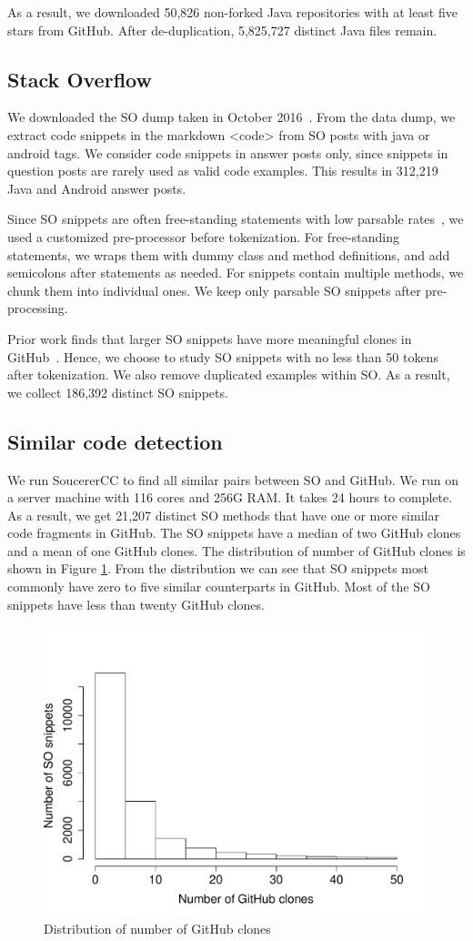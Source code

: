 As a result, we downloaded 50,826 non-forked Java repositories with at least five stars from GitHub. After de-duplication, 5,825,727 distinct Java files remain.


\subsection{Stack Overflow}
We downloaded the SO dump taken in October 2016~\cite{stackexchange}. From the data dump, we extract code snippets in the markdown {\ttt <code>} from SO posts with {\ttt java} or {\ttt android} tags.
We consider code snippets in answer posts only, since snippets in question posts are rarely used as valid code examples. This results in 312,219 Java and Android answer posts.

Since SO snippets are often free-standing statements with low parsable rates~\cite{yang2016query}, we used a customized pre-processor before tokenization. For free-standing statements, we wraps them with dummy class and method definitions, and add semicolons after statements as needed. For snippets contain multiple methods, we chunk them into individual ones. We keep only parsable SO snippets after pre-processing.

Prior work finds that larger SO snippets have more meaningful clones in GitHub~\cite{yang2017stack}. Hence, we choose to study SO snippets with no less than 50 tokens after tokenization. We also remove duplicated examples within SO. As a result, we collect 186,392 distinct SO snippets.

\subsection{Similar code detection}
We run SoucererCC to find all similar pairs between SO and GitHub. We run on a server machine with 116 cores and 256G RAM. It takes 24 hours to complete. As a result, we get 21,207 distinct SO methods that have one or more similar code fragments in GitHub. 
The SO snippets have a median of two GitHub clones and a mean of one GitHub clones. The distribution of number of GitHub clones is shown in Figure \ref{fig:num-clone}. From the distribution we can see that SO snippets most commonly have zero to five similar counterparts in GitHub. Most of the SO snippets have less than twenty GitHub clones.

\begin{figure}
	\includegraphics[scale=0.4]{figures/dist-gh-clone.pdf}
	\caption{Distribution of number of GitHub clones}
	\label{fig:num-clone}
\end{figure}


